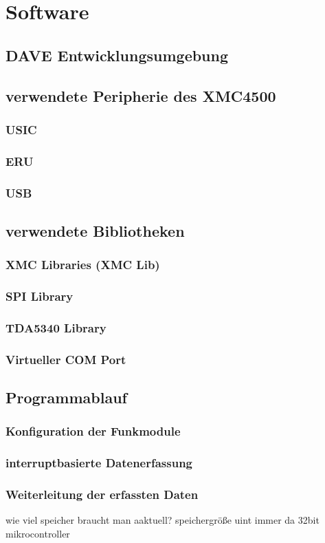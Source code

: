 \chapter{Software}
\label{sec:Software}
\pagestyle{scrheadings}
\section{DAVE Entwicklungsumgebung}
\section{verwendete Peripherie des XMC4500}
\subsection{USIC}
\subsection{ERU}
\subsection{USB}
\section{verwendete Bibliotheken}
\subsection{XMC Libraries (XMC Lib)}
\subsection{SPI Library}
\subsection{TDA5340 Library}
\subsection{Virtueller COM Port}
\section{Programmablauf}
\subsection{Konfiguration der Funkmodule}
\subsection{interruptbasierte Datenerfassung}
\subsection{Weiterleitung der erfassten Daten}
wie viel speicher braucht man aaktuell?
speichergröße uint immer da 32bit mikrocontroller